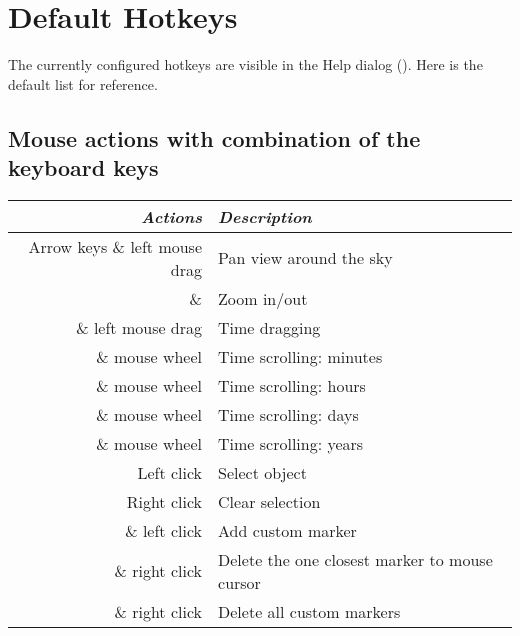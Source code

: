 
\chapter{Default Hotkeys}
\label{ch:Hotkeys}

The currently configured hotkeys are visible in the Help dialog (). Here is the default list for reference.

\section{Mouse actions with combination of the keyboard keys}
\label{ch:Hotkeys:MouseKeys}
\begin{longtabu} to \textwidth {rl}\toprule
\emph{Actions}	& \emph{Description}\\\midrule
Arrow keys \& left mouse drag	& Pan view around the sky \\
 \&  & Zoom in/out \\
\key{\ctrl} \& left mouse drag & Time dragging \\
\key{\ctrl} \& mouse wheel & Time scrolling: minutes \\
 \& mouse wheel & Time scrolling: hours \\
 \& mouse wheel & Time scrolling: days \\
 \& mouse wheel & Time scrolling: years \\
Left click & Select object \\
Right click & Clear selection \\
 \& left click & Add custom marker \\
 \& right click & Delete the one closest marker to mouse cursor\\
 \& right click & Delete all custom markers 
\\\bottomrule
\end{longtabu}

